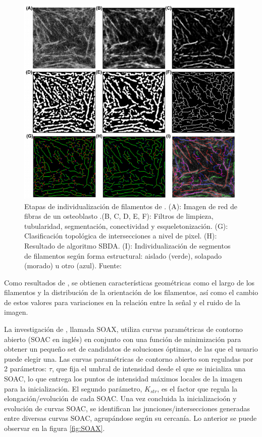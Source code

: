 \begin{figure}[H]
        \centering
        \includegraphics[scale=0.75]{imagenes/QuantitativeIFS.png}
        \caption{Etapas de individualizaci\'on de filamentos de \cite{qiu2014quantitative}. (A): Imagen de red de fibras de un osteoblasto .(B, C, D, E, F): Filtros de limpieza, tubularidad, segmentaci\'on, conectividad y esqueletonizaci\'on. (G): Clasificaci\'on topol\'ogica de intersecciones a nivel de pixel. (H): Resultado de algoritmo SBDA. (I): Individualizaci\'on de segmentos de filamentos seg\'un forma estructural: aislado (verde), solapado (morado) u otro (azul). Fuente: \cite{qiu2014quantitative}}
        \label{fig:IFS}
\end{figure}

Como resultados de \cite{qiu2014quantitative}, se obtienen caracter\'isticas geom\'etricas como el largo de los filamentos y la distribuci\'on de la orientaci\'on de los filamentos, as\'i como el cambio de estos valores para variaciones en la relaci\'on entre la se\~nal y el ruido de la imagen.

\smallskip
La investigaci\'on de \cite{xu2015soax}, llamada SOAX, utiliza curvas param\'etricas de contorno abierto (SOAC en ingl\'es) en conjunto con una funci\'on de minimizaci\'on para obtener un peque\~no set de candidatos de soluciones \'optimas, de las que el usuario puede elegir una. Las curvas param\'etricas de contorno abierto son reguladas por 2 par\'ametros: $\tau$, que fija el umbral de intensidad desde el que se inicializa una SOAC, lo que entrega los puntos de intensidad m\'aximos locales de la imagen para la inicializaci\'on. El segundo par\'ametro, $K_{str}$, es el factor que regula la elongaci\'on/evoluci\'on de cada SOAC. Una vez concluida la inicializacio\'on y evoluci\'on de curvas SOAC, se identifican las junciones/intersecciones generadas entre diversas curvas SOAC, agrup\'andose seg\'un su cercan\'ia. Lo anterior se puede observar en la figura \ref{fig:SOAX}.

